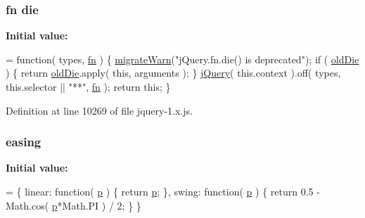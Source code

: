 \subsubsection[{\texorpdfstring{die}{die}}]{ {\bf fn} die}\hypertarget{jquery-1_8x_8js_af7e4e16696e8209560e9d5e304ea7628}{}\label{jquery-1_8x_8js_af7e4e16696e8209560e9d5e304ea7628}
{\bfseries Initial value\+:}
\begin{DoxyCode}
= \textcolor{keyword}{function}( types, \hyperlink{jquery-1_8x_8min_8js_a37b9e1ceee4c6d2616fa6081784b5468}{fn} ) \{
    \hyperlink{jquery-1_8x_8js_ac6036b3100bb484f96bfb15165e077f9}{migrateWarn}(\textcolor{stringliteral}{"jQuery.fn.die() is deprecated"});
    \textcolor{keywordflow}{if} ( \hyperlink{jquery-1_8x_8js_ad09378af6cf85e4cbf81905ae728d664}{oldDie} ) \{
        \textcolor{keywordflow}{return} \hyperlink{jquery-1_8x_8js_ad09378af6cf85e4cbf81905ae728d664}{oldDie}.apply( \textcolor{keyword}{this}, arguments );
    \}
    \hyperlink{jquery-1_8x_8js_a2b1d6f9c448e3ce72f4e1865d6e38d2c}{jQuery}( this.context ).off( types, this.selector || \textcolor{stringliteral}{"**"}, \hyperlink{jquery-1_8x_8min_8js_a37b9e1ceee4c6d2616fa6081784b5468}{fn} );
    \textcolor{keywordflow}{return} \textcolor{keyword}{this};
\}
\end{DoxyCode}


Definition at line 10269 of file jquery-\/1.\+x.\+js.

\subsubsection[{\texorpdfstring{easing}{easing}}]{ easing}\hypertarget{jquery-1_8x_8js_a9758a312629fa6de1744280dd6e6253b}{}\label{jquery-1_8x_8js_a9758a312629fa6de1744280dd6e6253b}
{\bfseries Initial value\+:}
\begin{DoxyCode}
= \{
    linear: \textcolor{keyword}{function}( \hyperlink{jquery-1_8x_8min_8js_ad1707b001240e9c8298830073364c8bf}{p} ) \{
        \textcolor{keywordflow}{return} \hyperlink{jquery-1_8x_8min_8js_ad1707b001240e9c8298830073364c8bf}{p};
    \},
    swing: \textcolor{keyword}{function}( \hyperlink{jquery-1_8x_8min_8js_ad1707b001240e9c8298830073364c8bf}{p} ) \{
        \textcolor{keywordflow}{return} 0.5 - Math.cos( \hyperlink{jquery-1_8x_8min_8js_ad1707b001240e9c8298830073364c8bf}{p}*Math.PI ) / 2;
    \}
\}
\end{DoxyCode}


